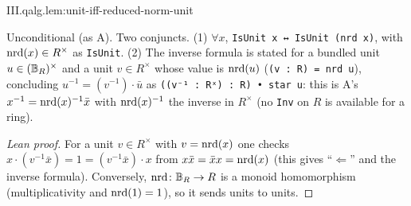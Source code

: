 \begin{lemma}[units]
\end{lemma}
\begin{tfformal}{III.qalg.lem:unit-iff-reduced-norm-unit}
\begin{tffidelity}
Unconditional (as A). Two conjuncts. (1) $\forall x$, \texttt{IsUnit x ↔ IsUnit (nrd x)}, with $\operatorname{nrd}(x)\in R^\times$ as \texttt{IsUnit}. (2) The inverse formula is stated for a bundled unit $u\in(\mathbb{B}_R)^\times$ and a unit $v\in R^\times$ whose value is $\operatorname{nrd}(u)$ (\texttt{(v : R) = nrd u}), concluding $u^{-1}=(v^{-1})\cdot\bar u$ as \texttt{((v⁻¹ : Rˣ) : R) • star u}: this is A's $x^{-1}=\operatorname{nrd}(x)^{-1}\bar x$ with $\operatorname{nrd}(x)^{-1}$ the inverse in $R^\times$ (no \texttt{Inv} on $R$ is available for a ring).
\end{tffidelity}
\end{tfformal}
\begin{proof}[Lean proof]
For a unit $v\in R^\times$ with $v=\operatorname{nrd}(x)$ one checks $x\cdot(v^{-1}\bar x)=1=(v^{-1}\bar x)\cdot x$ from $x\bar x=\bar x x=\operatorname{nrd}(x)$ (this gives ``$\Leftarrow$'' and the inverse formula). Conversely, $\operatorname{nrd}\colon\mathbb{B}_R\to R$ is a monoid homomorphism (multiplicativity and $\operatorname{nrd}(1)=1$), so it sends units to units.
\end{proof}

